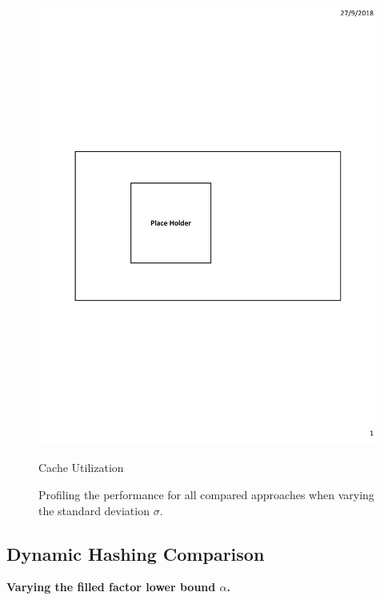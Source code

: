\begin{figure}[h]
\begin{minipage}{0.3\linewidth}
	\includegraphics[width=\linewidth]{fig/PlaceHolder.pdf}
	\centerline{Cache Utilization}
	\end{minipage}
	\caption{Profiling the  performance for all compared approaches when varying the standard deviation $\sigma$.}
	\label{fig:static}
\end{figure}

\subsection{Dynamic Hashing Comparison}\label{sec:exp:dynamic}

\vspace{1mm}\noindent\textbf{Varying the filled factor lower bound $\alpha$.}

